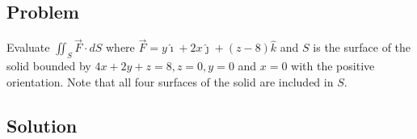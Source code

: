 \documentclass[12pt]{article}
\begin{document}
\subsection{Problem}

Evaluate \(\iint_S \vec{F} \cdot d S\) where
\(\vec{F} = y \hat{\imath} + 2x \hat{\jmath} + (z - 8) \hat{k}\) and \(S\) is the surface of the
solid bounded by \(4x + 2y + z = 8, z = 0, y = 0\) and \(x = 0\) with the positive orientation.
Note that all four surfaces of the solid are included in \(S\).

\subsection{Solution}



\newpage


\nocite{El-Deeb_PEU-218_Assignments}
\end{document}
